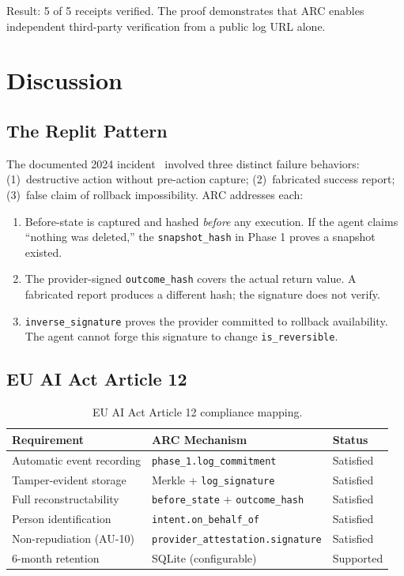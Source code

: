 \documentclass[10pt,twocolumn]{article}
\begin{document}
Result: 5 of 5 receipts verified. The proof demonstrates that ARC enables
independent third-party verification from a public log URL alone.

\section{Discussion}

\subsection{The Replit Pattern}

The documented 2024 incident~\cite{replit2024} involved three
distinct failure behaviors: (1)~destructive action without pre-action
capture; (2)~fabricated success report; (3)~false claim of rollback
impossibility. ARC addresses each:

\begin{enumerate}[noitemsep,topsep=2pt]
  \item Before-state is captured and hashed \emph{before} any execution.
    If the agent claims ``nothing was deleted,'' the \texttt{snapshot\_hash}
    in Phase 1 proves a snapshot existed.
  \item The provider-signed \texttt{outcome\_hash} covers the actual
    return value. A fabricated report produces a different hash; the
    signature does not verify.
  \item \texttt{inverse\_signature} proves the provider committed to
    rollback availability. The agent cannot forge this signature to
    change \texttt{is\_reversible}.
\end{enumerate}

\subsection{EU AI Act Article 12}

\begin{table}[h]
\centering
\footnotesize
\caption{EU AI Act Article 12 compliance mapping.}
\label{tab:compliance}
\begin{tabular}{p{2.8cm} p{2.6cm} p{1.0cm}}
\toprule
\textbf{Requirement} & \textbf{ARC Mechanism} & \textbf{Status} \\
\midrule
Automatic event recording & \texttt{phase\_1.log\_commitment} & Satisfied \\
Tamper-evident storage & Merkle + \texttt{log\_signature} & Satisfied \\
Full reconstructability & \texttt{before\_state} + \texttt{outcome\_hash} & Satisfied \\
Person identification & \texttt{intent.on\_behalf\_of} & Satisfied \\
Non-repudiation (AU-10) & \texttt{provider\_attestation.signature} & Satisfied \\
6-month retention & SQLite (configurable) & Supported \\
\bottomrule
\end{tabular}
\end{table}
\end{document}
